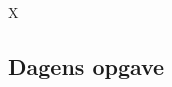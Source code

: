 \begin{minipage}[t]{100mm}
\vspace{3mm}
X
\vspace{-4mm}
\begin{center}
\section*{Dagens opgave}
\end{center}



\end{minipage}

